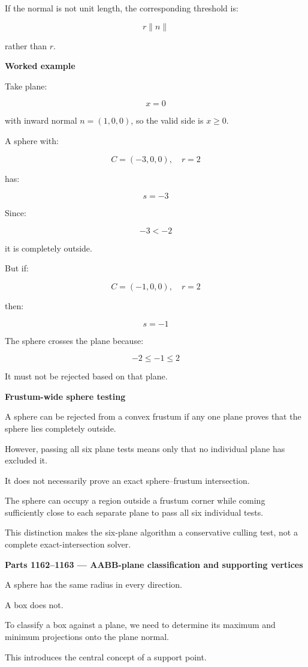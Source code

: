 If the normal is not unit length, the corresponding threshold is:

\[
r\|n\|
\]

rather than \(r\).

\textbf{Worked example}

Take plane:

\[
x=0
\]

with inward normal \(n=(1,0,0)\), so the valid side is \(x\ge0\).

A sphere with:

\[
C=(-3,0,0),\quad r=2
\]

has:

\[
s=-3
\]

Since:

\[
-3<-2
\]

it is completely outside.

But if:

\[
C=(-1,0,0),\quad r=2
\]

then:

\[
s=-1
\]

The sphere crosses the plane because:

\[
-2\le-1\le2
\]

It must not be rejected based on that plane.

\textbf{Frustum-wide sphere testing}

A sphere can be rejected from a convex frustum if any one plane proves that the sphere lies completely outside.

However, passing all six plane tests means only that no individual plane has excluded it.

It does not necessarily prove an exact sphere--frustum intersection.

The sphere can occupy a region outside a frustum corner while coming sufficiently close to each separate plane to pass all six individual tests.

This distinction makes the six-plane algorithm a conservative culling test, not a complete exact-intersection solver.

\textbf{Parts 1162--1163 --- AABB-plane classification and supporting vertices}

A sphere has the same radius in every direction.

A box does not.

To classify a box against a plane, we need to determine its maximum and minimum projections onto the plane normal.

This introduces the central concept of a support point.

